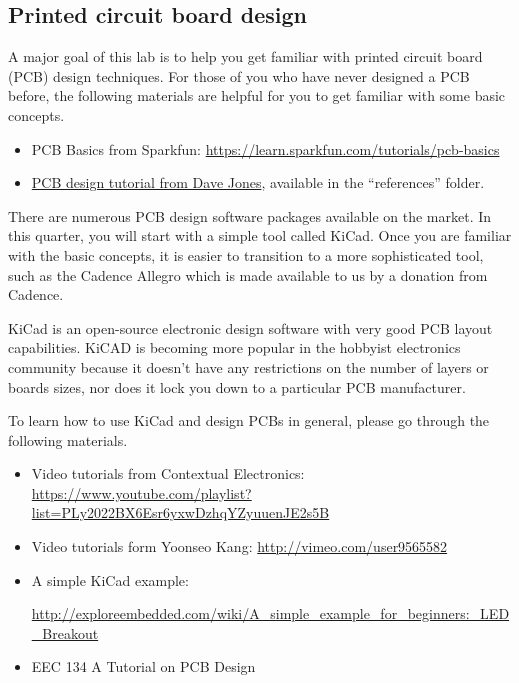 \documentclass[letterpaper, 11pt]{article}
\begin{document}
\subsection{Printed circuit board design}
A major goal of this lab is to help you get familiar with printed circuit board (PCB) design techniques. For those of you who have never designed a PCB before, the following materials are helpful for you to get familiar with some basic concepts. 

\begin{itemize}[itemsep=0.1ex]

	\item PCB Basics from Sparkfun:	 \url{https://learn.sparkfun.com/tutorials/pcb-basics} 
	
	\item \href{https://github.com/ucdart/UCD-EEC134/blob/master/labs/lab1/references/%5BJones2009%5D.PCB.Design.Tutorial.pdf}{PCB design tutorial from Dave Jones}, available in the ``references'' folder.
		
\end{itemize}

There are numerous PCB design software packages available on the market. In this quarter, you will start with a simple tool called KiCad. Once you are familiar with the basic concepts, it is easier to transition to a more sophisticated tool, such as the Cadence Allegro which is made available to us by a donation from Cadence. 

KiCad is an open-source electronic design software with very good PCB layout capabilities. KiCAD is becoming more popular in the hobbyist electronics community because it doesn't have any restrictions on the number of layers or boards sizes, nor does it lock you down to a particular PCB manufacturer.

To learn how to use KiCad and design PCBs in general, please go through the following materials.

\begin{itemize}[itemsep=0.1ex]

	\item Video tutorials from Contextual Electronics:	 \url{https://www.youtube.com/playlist?list=PLy2022BX6Esr6yxwDzhqYZyuuenJE2s5B} 
	
	\item Video tutorials form  Yoonseo Kang:	 \url{http://vimeo.com/user9565582} 

	\item A simple KiCad example: 
	
		\url{http://exploreembedded.com/wiki/A_simple_example_for_beginners:_LED_Breakout} 
	
	\item EEC 134 A Tutorial on PCB Design
		
\end{itemize}
\end{document}
